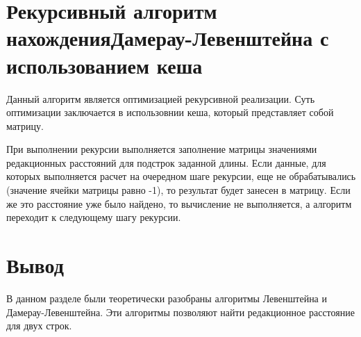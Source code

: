 \section{Рекурсивный алгоритм нахождения Дамерау-Левенштейна с использованием кеша}

Данный алгоритм является оптимизацией рекурсивной реализации. Суть оптимизации заключается в использовнии кеша, который представляет собой матрицу.

При выполнении рекурсии выполняется заполнение матрицы значениями редакционных расстояний для подстрок заданной длины. Если данные, для которых выполняется расчет на очередном шаге рекурсии, еще не обрабатывались (значение ячейки матрицы равно -1), то результат будет занесен в матрицу. Если же это расстояние уже было найдено, то вычисление не выполняется, а алгоритм переходит к следующему шагу рекурсии.

\section*{Вывод}
В данном разделе были теоретически разобраны алгоритмы Левенштейна и Дамерау-Левенштейна. Эти алгоритмы позволяют найти редакционное расстояние для двух строк.

